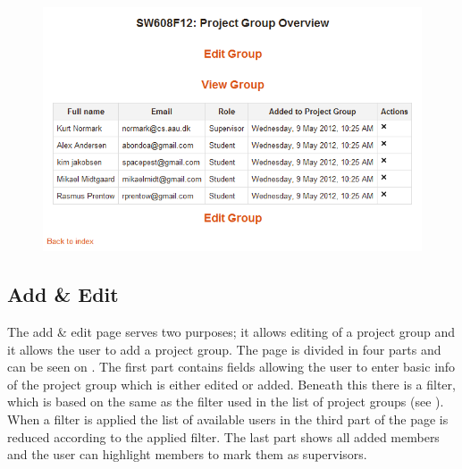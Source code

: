 \begin{figure}
	\centering
		\includegraphics[width=\textwidth]{images/moodleprojectgroupoverview.png}
	\label{fig:moodlepoverview}
\end{figure}
\FloatBarrier

\subsection{Add \& Edit}
\label{sec:addandedit}
The add \& edit page serves two purposes; it allows editing of a project group and it allows the user to add a project group.
The page is divided in four parts and can be seen on . 
The first part contains fields allowing the user to enter basic info of the project group which is either edited or added. 
Beneath this there is a filter, which is based on the same as the filter used in the list of project groups (see ). 
When a filter is applied the list of available users in the third part of the page is reduced according to the applied filter. 
The last part shows all added members and the user can highlight members to mark them as supervisors. 


